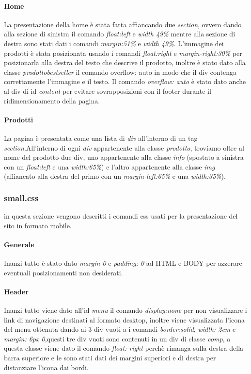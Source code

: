 \paragraph{Home} \Spazio
La presentazione della home è stata fatta affiancando due \emph{section}, ovvero dando alla sezione di sinistra il comando \emph{float:left} e \emph{width 49\%} mentre alla sezione di destra sono stati dati i comandi \emph{margin:51\%} e \emph{width 49\%}. 
L'immagine dei prodotti è stata posizionata usando i comandi \emph{float:right} e \emph{margin-right:30\%} per posizionarla alla destra del testo che descrive il prodotto, inoltre è stato dato alla classe \emph{prodottobestseller} il comando overflow: auto in modo che il div contenga correttamente l'immagine e il testo.
Il comando \emph{overflow: auto} è stato dato anche al div di id \emph{content} per evitare sovrapposizioni con il footer durante il ridimensionamento della pagina.

\paragraph{Prodotti} \Spazio
La pagina è presentata come una lista di \emph{div} all'interno di un tag \emph{section}.\newline All'interno di ogni \emph{div} appartenente alla classe \emph{prodotto}, troviamo oltre al nome del prodotto due div, uno appartenente alla classe \emph{info} (spostato a sinistra con un \emph{float:left} e una \emph{width:65\%}) e l'altro appartenente alla classe \emph{img} (affiancato alla destra del primo con un \emph{margin-left:65\%} e una \emph{width:35\%}). 


\subsubsection{small.css}
in questa sezione vengono descritti i comandi css usati per la presentazione del sito in formato mobile.

\paragraph{Generale} \Spazio
Inanzi tutto è stato dato \emph{margin 0} e \emph{padding: 0} ad HTML e BODY per azzerare eventuali posizionamenti non desiderati. 

\paragraph{Header} \Spazio
Inanzi tutto viene dato all'id \emph{menu} il comando \emph{display:none} per non visualizzare i link di navigazione destinati al formato desktop, inoltre viene visualizzata l'icona del menu ottenuta dando ai 3 div vuoti a i comandi \emph{border:solid}, \emph{width: 2em} e \emph{margin: 6px 0},questi tre div vuoti sono contenuti in un div di classe \emph{comp}, a questa classe viene dato il comando \emph{float: right} perchè rimanga sulla destra della barra superiore e le sono stati dati dei margini superiori e di destra per distanziare l'icona dai bordi.

